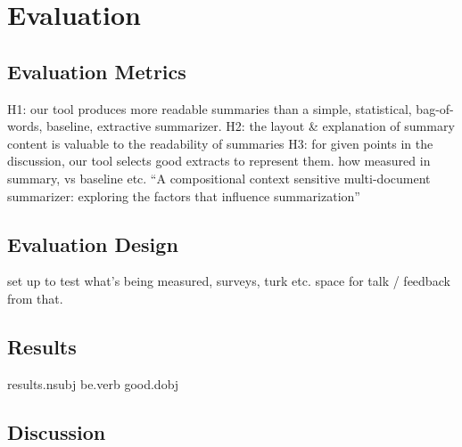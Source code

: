 \chapter{Evaluation\label{chap:evaluation}}
  \section{Evaluation Metrics}
    H1: our tool produces more readable summaries than a simple, statistical, bag-of-words, baseline, extractive summarizer.
    H2: the layout \& explanation of summary content is valuable to the readability of summaries
    H3: for given points in the discussion, our tool selects good extracts to represent them.
    how measured in summary, vs baseline etc.
    ``A compositional context sensitive multi-document summarizer: exploring the factors that influence summarization''
  \section{Evaluation Design}
    set up to test what's being measured, surveys, turk etc.
    space for talk / feedback from that.
  \section{Results}
    results.nsubj be.verb good.dobj
  \section{Discussion}
